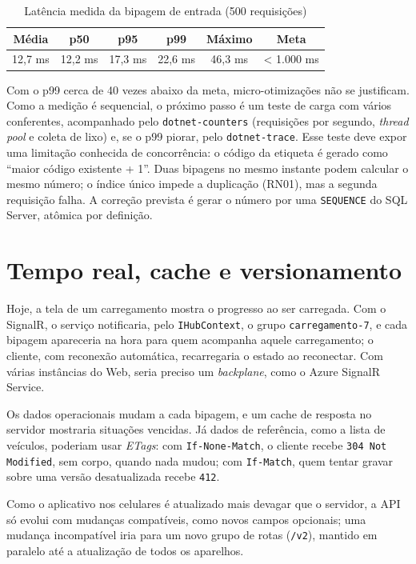 \begin{table}[htbp]
\centering
\caption{Latência medida da bipagem de entrada (500 requisições)}
\label{tab:latencia}
\footnotesize
\begin{tabular}{|c|c|c|c|c|c|}
\hline
\textbf{Média} & \textbf{p50} & \textbf{p95} & \textbf{p99} & \textbf{Máximo} & \textbf{Meta} \\ \hline
12,7 ms & 12,2 ms & 17,3 ms & 22,6 ms & 46,3 ms & < 1.000 ms \\ \hline
\end{tabular}
\end{table}

Com o p99 cerca de 40 vezes abaixo da meta, micro-otimizações não se justificam. Como a medição é sequencial, o próximo passo é um teste de carga com vários conferentes, acompanhado pelo \texttt{dotnet-counters} (requisições por segundo, \textit{thread pool} e coleta de lixo) e, se o p99 piorar, pelo \texttt{dotnet-trace}. Esse teste deve expor uma limitação conhecida de concorrência: o código da etiqueta é gerado como ``maior código existente + 1''. Duas bipagens no mesmo instante podem calcular o mesmo número; o índice único impede a duplicação (RN01), mas a segunda requisição falha. A correção prevista é gerar o número por uma \texttt{SEQUENCE} do SQL Server, atômica por definição.

\section{Tempo real, cache e versionamento}

Hoje, a tela de um carregamento mostra o progresso ao ser carregada. Com o SignalR, o serviço notificaria, pelo \texttt{IHubContext}, o grupo \texttt{carregamento-7}, e cada bipagem apareceria na hora para quem acompanha aquele carregamento; o cliente, com reconexão automática, recarregaria o estado ao reconectar. Com várias instâncias do Web, seria preciso um \textit{backplane}, como o Azure SignalR Service.

Os dados operacionais mudam a cada bipagem, e um cache de resposta no servidor mostraria situações vencidas. Já dados de referência, como a lista de veículos, poderiam usar \textit{ETags}: com \texttt{If-None-Match}, o cliente recebe \texttt{304 Not Modified}, sem corpo, quando nada mudou; com \texttt{If-Match}, quem tentar gravar sobre uma versão desatualizada recebe \texttt{412}.

Como o aplicativo nos celulares é atualizado mais devagar que o servidor, a API só evolui com mudanças compatíveis, como novos campos opcionais; uma mudança incompatível iria para um novo grupo de rotas (\texttt{/v2}), mantido em paralelo até a atualização de todos os aparelhos.

